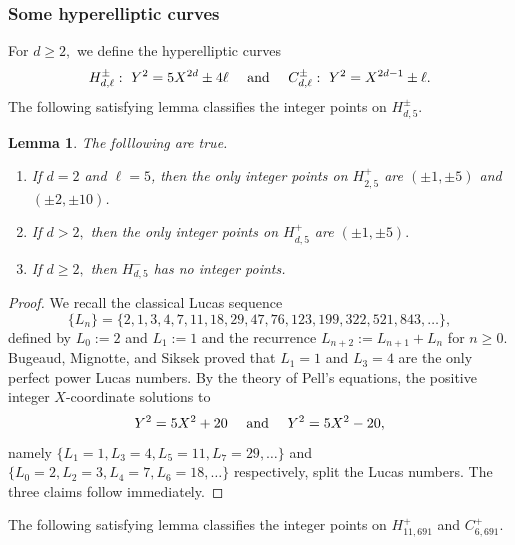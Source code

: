 \documentclass[12pt]{amsart}
\newtheorem{lem}{Lemma}[section]
\numberwithin{equation}{section}
\begin{document}
\subsubsection{Some hyperelliptic curves}
For $d\geq 2,$ we define the hyperelliptic curves
\begin{equation}
H^{\pm}_{d,\ell}:  \ Y^2 =5 X^{2d}\pm 4\ell \ \ \ \ {\text {\rm and}}\ \ \ \ C^{\pm}_{d,\ell}: \ Y^2=X^{2d-1}\pm \ell.
\end{equation}
The following satisfying lemma classifies the integer points on $H_{d,5}^{\pm}.$
\begin{lem}\label{AnnalsCorollary}
The folllowing are true.
\begin{enumerate}
\item If $d=2$ and $\ell=5$, then the only integer points on $H^{+}_{2,5}$ are $(\pm 1, \pm 5)$ and $(\pm 2, \pm 10)$.
\item If $d>2,$ then the only integer points on $H^{+}_{d,5}$ are $(\pm 1, \pm 5).$
\item If $d\geq 2,$ then $H^{-}_{d,5}$ has no integer points.
\end{enumerate}
\end{lem}
\begin{proof} 
We recall the classical Lucas sequence $$\{L_n\}=\{2, 1, 3, 4, 7, 11, 18, 29, 47,76, 123, 199, 322, 521, 843,\dots\},$$ defined by
$L_0:=2$ and $L_1:=1$ and the recurrence $L_{n+2}:=L_{n+1}+L_n$ for $n\geq 0$.
Bugeaud, Mignotte, and Siksek \cite{AnnalsFibonacci} proved that $L_1=1$ and $L_3=4$
are the only perfect power Lucas numbers.
By the theory of Pell's equations, the positive integer $X$-coordinate solutions to
$$ Y^2 = 5X^2 + 20 \ \ \ \ {\text {\rm and}}\ \ \ \ Y^2=5X^2-20,$$
namely $\{L_1=1, L_3= 4,L_5=11,L_7= 29,\dots\}$ and
$\{L_0=2, L_2=3, L_4=7, L_6=18,\dots\}$ respectively, split the Lucas numbers. The three claims follow immediately.
\end{proof}

The following satisfying lemma classifies the integer points on $H_{11,691}^{+}$ and $C_{6,691}^{+}.$
\end{document}
